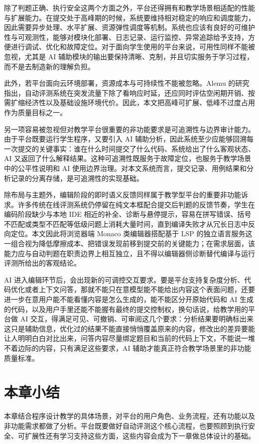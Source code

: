 除了判题正确、执行安全这两个方面之外，平台还得拥有和教学场景相适配的性能与扩展能力。在提交处于高峰期的时候，系统要维持相对稳定的响应和调度能力，因此需要异步处理、水平扩展、资源弹性调度等机制。系统也应该有良好的可维护性与可观测性，能够对模块化部署、日志记录、运行监控、异常追踪给予支持，方便进行调试、优化和故障定位。对于面向学生使用的平台来说，可用性同样不能被忽视，尤其是 AI 辅助模块的输出要保持清晰、克制，并且切实服务于学习过程，而不是去制造新的理解负担。

此外，若平台面向云环境部署，资源成本与可持续性不能被忽略。Alemu 的研究指出，自动评测系统在突发流量下除了看响应时延，还应同时评估空闲期开销、按需扩缩经济性以及基础设施环境代价\cite{alemu2023serverless}。因此，本文把高峰可扩展、低峰不过度占用作为质量目标之一。

另一项容易被忽视但对教学平台很重要的非功能要求是可追溯性与边界审计能力。由于平台既要运行学生程序，又要引入 AI 辅助分析，因此系统至少应能够回溯每一次提交的关键事实：谁在什么时间提交了什么代码、系统给出了什么客观状态、AI 又返回了什么解释结果。这种可追溯性既服务于故障定位，也服务于教学场景中的公平性说明和 AI 使用边界治理。对本文系统而言，提交记录、用例结果和分析记录的分离存储，是可追溯性的实现基础。

除布局与主题外，编辑阶段的即时语义反馈同样属于教学型平台的重要非功能诉求。许多传统在线评测系统仍停留在纯文本框配合提交后判题的反馈节奏，学生在编码阶段缺少与本地 IDE 相近的补全、诊断与悬停提示，容易在拼写错误、括号不匹配或类型不匹配等低级问题上消耗大量时间，直到编译失败才从冗长日志中反向定位。本文因此将浏览器端 Monaco 类编辑器搭配基于 LSP 的独立语言服务这一组合视为降低摩擦成本、把错误发现前移到提交前的关键能力；在需求层面，该能力应与自动判题在职责边界上相互独立，且不得以编辑器侧诊断替代编译与运行评测所给出的客观结论\cite{lsp2024spec,monacoeditorrepo}。

AI 进入编辑环节后，会出现新的可调控交互要求。要是平台支持复杂度分析、代码优化或者上下文问答，那就不能只在意模型能不能给出内容这个表面问题，还要进一步在意用户能不能看懂内容是怎么生成的，能不能区分开原始代码和 AI 生成的代码，以及用户手里还能不能握有最终的提交控制权，换句话说，给教学用的平台做 AI 交互，得满足可见、可撤销、可审阅这几个要求：分析结果要明确标出来这只是辅助信息，优化过的结果不能直接悄悄覆盖原来的内容，修改出的差异要能让人明明白白对比出来，问答内容尽量绑定题目和当前的代码上下文，不能说一堆不着边际的内容，只有满足这些要求，AI 辅助才能真正符合教学场景里的非功能质量标准。

\section{本章小结}

本章结合程序设计教学的具体场景，对平台的用户角色、业务流程，还有功能以及非功能需求都做了分析。平台既要做好自动评测这个核心流程，也要照顾到执行安全、可扩展性还有学习支持这些方面，这些内容会成为下一章做总体设计的基础。
